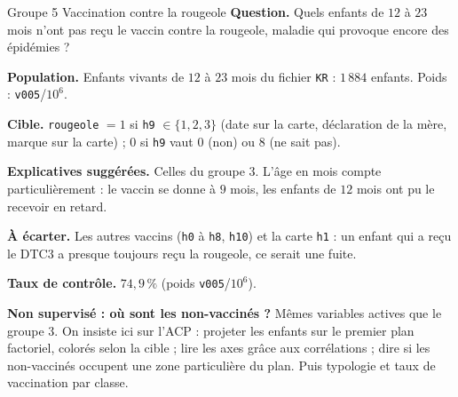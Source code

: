 \documentclass[11pt]{article}
\begin{document}
\begin{fiche}{Groupe 5 \textendash{} Vaccination contre la rougeole}
\textbf{Question.} Quels enfants de $12$ à $23$ mois n'ont pas reçu le vaccin contre la rougeole, maladie qui provoque encore des épidémies ?

\textbf{Population.} Enfants vivants de $12$ à $23$ mois du fichier \texttt{KR} : $1\,884$ enfants. Poids : \texttt{v005}/$10^6$.

\textbf{Cible.} \texttt{rougeole} $=1$ si \texttt{h9} $\in\{1,2,3\}$ (date sur la carte, déclaration de la mère, marque sur la carte) ; $0$ si \texttt{h9} vaut $0$ (non) ou $8$ (ne sait pas).

\textbf{Explicatives suggérées.} Celles du groupe 3. L'âge en mois compte particulièrement : le vaccin se donne à $9$ mois, les enfants de $12$ mois ont pu le recevoir en retard.

\textbf{À écarter.} Les autres vaccins (\texttt{h0} à \texttt{h8}, \texttt{h10}) et la carte \texttt{h1} : un enfant qui a reçu le DTC3 a presque toujours reçu la rougeole, ce serait une fuite.

\textbf{Taux de contrôle.} $74{,}9\,\%$ (poids \texttt{v005}/$10^6$).

\textbf{Non supervisé : où sont les non-vaccinés ?} Mêmes variables actives que le groupe 3. On insiste ici sur l'ACP : projeter les enfants sur le premier plan factoriel, colorés selon la cible ; lire les axes grâce aux corrélations ; dire si les non-vaccinés occupent une zone particulière du plan. Puis typologie et taux de vaccination par classe.
\end{fiche}

\end{document}
